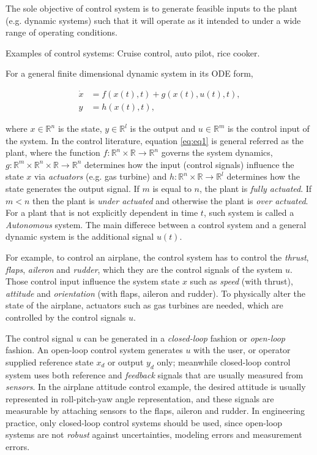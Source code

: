 \documentclass[12pt]{article}
\begin{document}
The sole objective of control system is to generate feasible inputs
to the plant (e.g. dynamic systems) such that it will operate as it
intended to under a wide range of operating conditions.

Examples of control systems: Cruise control, auto pilot, rice cooker.

For a general finite dimensional dynamic system in its ODE form,

\begin{align}
  \label{eq:eq1}
  \dot{x} &= f(x(t),t) + g(x(t), u(t), t), \\
  y &= h(x(t),t), \nonumber
\end{align}

where $x \in \mathbb{R}^n$ is the state, $y \in \mathbb{R}^l$ is the
output and $u \in \mathbb{R}^m$ is the control input of the system.
In the control literature, equation \ref{eq:eq1} is general referred
as the plant, where the function $f: \mathbb{R}^n \times
\mathbb{R} \rightarrow \mathbb{R}^n$ governs the system dynamics, $g:
\mathbb{R}^m \times \mathbb{R}^n \times \mathbb{R} \rightarrow
\mathbb{R}^n$ determines how the input (control signals)
influence the state $x$ via {\em actuators} (e.g. gas turbine) and
 $h: \mathbb{R}^n \times \mathbb{R} \rightarrow \mathbb{R}^l$
 determines how the state generates the output signal.  If $m$ is equal to $n$, the plant is
{\em fully actuated}. If $m < n$ then the plant is {\em under actuated}
and otherwise the plant is {\em over actuated}. For a plant that is not
explicitly dependent in time $t$, such system is called a
{\em Autonomous} system.   The main
 differece between a control system and a general dynamic system is
 the additional signal $u(t)$.

For example, to control an airplane, the control system has to control
the {\em thrust}, {\em flaps}, {\em aileron} and {\em rudder}, which they
are the control signals of the system $u$.  Those control input
influence the system state $x$ such as {\em speed} (with thrust),
{\em attitude} and {\em orientation} (with flaps, aileron and rudder).
To physically alter the state of the airplane, actuators such as
gas turbines are needed, which are controlled by the control signals $u$.

The control signal $u$ can be generated in a {\em closed-loop} fashion
or {\em open-loop} fashion.  An open-loop control system generates $u$
with the user, or operator supplied reference state $x_{d}$ or output
$y_{d}$ only; meanwhile closed-loop control system uses both reference
and {\em feedback} signals that are usually measured from
{\em sensors}. In the airplane attitude control example, the desired
attitude is usually represented in roll-pitch-yaw angle
representation, and these signals are measurable by attaching
sensors to the flaps, aileron and rudder.  In engineering
practice, only closed-loop control systems should be used, since
open-loop systems are not {\em robust} against uncertainties, modeling
errors and measurement errors.
\end{document}
